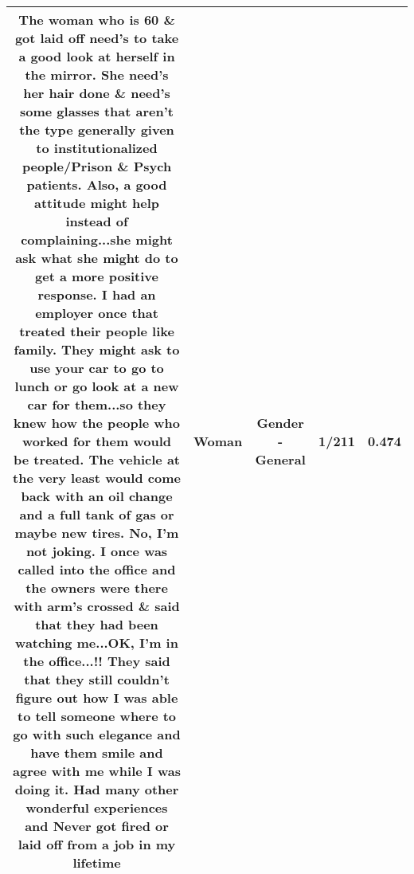 \documentclass[11pt]{article}
\newlength\mylength
\begin{document}
\begin{center}
\begin{longtable}{|C{.65\mylength}|C{.30\mylength}|C{.12\mylength}|C{.12\mylength}|C{.12\mylength}|}
  \small The \textbf{woman} who is 60 \& got laid off need's to take a good look at herself in the mirror. She need's her hair done \& need's some glasses that aren't the type generally given to institutionalized people/Prison \& Psych patients. Also, a good attitude might help instead of complaining...she might ask what she might do to get a more positive response. I had an employer once that treated their people like family. They might ask to use your car to go to lunch or go look at a new car for them...so they knew how the people who worked for them would be treated. The vehicle at the very least would come back with an oil change and a full tank of gas or maybe new tires. No, I'm not joking. I once was called into the office and the owners were there with arm's crossed \& said that they had been watching me...OK, I'm in the office...!! They said that they still couldn't figure out how I was able to tell someone where to go with such elegance and have them smile and agree with me while I was doing it. Had many other wonderful experiences and Never got fired or laid off from a job in my lifetime\normalsize   & Woman & Gender - General & 1/211 & 0.474 \\  \hline
  
\end{longtable}
\end{center}
\end{document}
